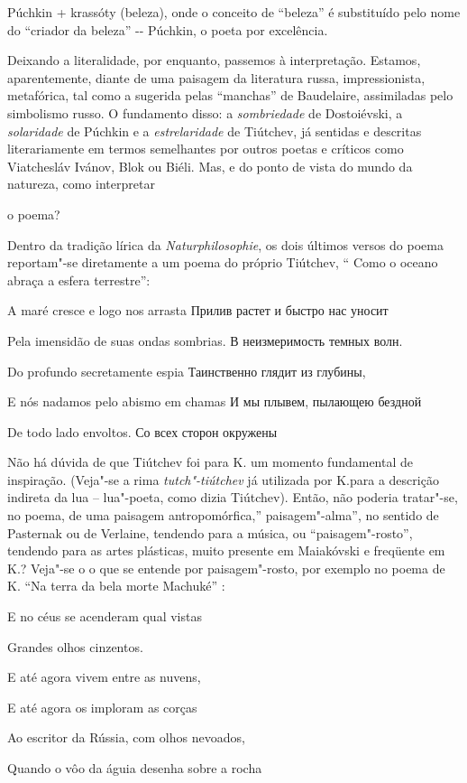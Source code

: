Púchkin + krassóty (beleza), onde o conceito de ``beleza'' é substituído
pelo nome do ``criador da beleza'' -\/- Púchkin, o poeta por excelência.

Deixando a literalidade, por enquanto, passemos à interpretação.
Estamos, aparentemente, diante de uma paisagem da literatura russa,
impressionista, metafórica, tal como a sugerida pelas ``manchas'' de
Baudelaire, assimiladas pelo simbolismo russo. O fundamento disso: a
\emph{sombriedade} de Dostoiévski, a \emph{solaridade} de Púchkin e a
\emph{estrelaridade} de Tiútchev, já sentidas e descritas literariamente
em termos semelhantes por outros poetas e críticos como Viatchesláv
Ivánov, Blok ou Biéli. Mas, e do ponto de vista do mundo da natureza,
como interpretar

o poema?

Dentro da tradição lírica da \emph{Naturphilosophie}, os dois últimos
versos do poema reportam"-se diretamente a um poema do próprio Tiútchev,
`` Como o oceano abraça a esfera terrestre'':

A maré cresce e logo nos arrasta Прилив растет и быстро нас уносит

Pela imensidão de suas ondas sombrias. В неизмеримость темных волн.

Do profundo secretamente espia Таинственно глядит из глубины,

E nós nadamos pelo abismo em chamas И мы плывем, пылающею бездной

De todo lado envoltos. Со всех сторон окружены

Não há dúvida de que Tiútchev foi para K. um momento fundamental de
inspiração. (Veja"-se a rima \emph{tutch"-tiútchev} já utilizada por
K.para a descrição indireta da lua -- lua"-poeta, como dizia Tiútchev).
Então, não poderia tratar"-se, no poema, de uma paisagem
antropomórfica,'' paisagem"-alma'', no sentido de Pasternak ou de
Verlaine, tendendo para a música, ou ``paisagem"-rosto'', tendendo para
as artes plásticas, muito presente em Maiakóvski e freqüente em K.?
Veja"-se o o que se entende por paisagem"-rosto, por exemplo no poema de
K. ``Na terra da bela morte Machuké'' :

E no céus se acenderam qual vistas

Grandes olhos cinzentos.

E até agora vivem entre as nuvens,

E até agora os imploram as corças

Ao escritor da Rússia, com olhos nevoados,

Quando o vôo da águia desenha sobre a rocha

